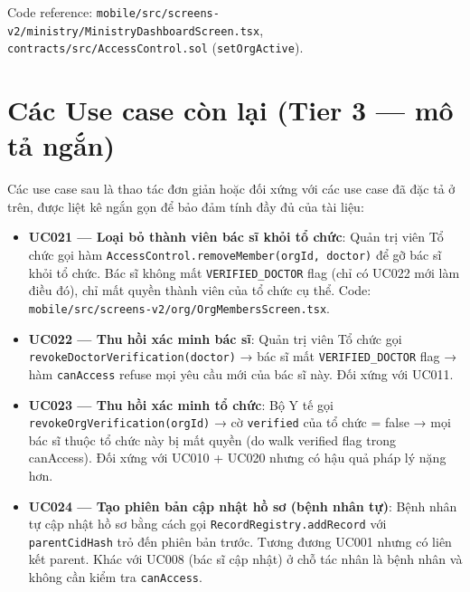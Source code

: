 \documentclass[../DoAn]{subfiles}
\begin{document}
Code reference: \texttt{mobile/src/screens-v2/ministry/MinistryDashboardScreen.tsx}, \texttt{contracts/src/AccessControl.sol} (\texttt{setOrgActive}).

\section*{Các Use case còn lại (Tier 3 --- mô tả ngắn)}

Các use case sau là thao tác đơn giản hoặc đối xứng với các use case đã đặc tả ở trên, được liệt kê ngắn gọn để bảo đảm tính đầy đủ của tài liệu:

\begin{itemize}
    \item \textbf{UC021 --- Loại bỏ thành viên bác sĩ khỏi tổ chức}: Quản trị viên Tổ chức gọi hàm \texttt{AccessControl.removeMember(orgId, doctor)} để gỡ bác sĩ khỏi tổ chức. Bác sĩ không mất \texttt{VERIFIED\_DOCTOR} flag (chỉ có UC022 mới làm điều đó), chỉ mất quyền thành viên của tổ chức cụ thể. Code: \texttt{mobile/src/screens-v2/org/OrgMembersScreen.tsx}.
    \item \textbf{UC022 --- Thu hồi xác minh bác sĩ}: Quản trị viên Tổ chức gọi \texttt{revokeDoctorVerification(doctor)} → bác sĩ mất \texttt{VERIFIED\_DOCTOR} flag → hàm \texttt{canAccess} refuse mọi yêu cầu mới của bác sĩ này. Đối xứng với UC011.
    \item \textbf{UC023 --- Thu hồi xác minh tổ chức}: Bộ Y tế gọi \texttt{revokeOrgVerification(orgId)} → cờ \texttt{verified} của tổ chức = false → mọi bác sĩ thuộc tổ chức này bị mất quyền (do walk verified flag trong canAccess). Đối xứng với UC010 + UC020 nhưng có hậu quả pháp lý nặng hơn.
    \item \textbf{UC024 --- Tạo phiên bản cập nhật hồ sơ (bệnh nhân tự)}: Bệnh nhân tự cập nhật hồ sơ bằng cách gọi \texttt{RecordRegistry.addRecord} với \texttt{parentCidHash} trỏ đến phiên bản trước. Tương đương UC001 nhưng có liên kết parent. Khác với UC008 (bác sĩ cập nhật) ở chỗ tác nhân là bệnh nhân và không cần kiểm tra \texttt{canAccess}.
\end{itemize}
\end{document}

